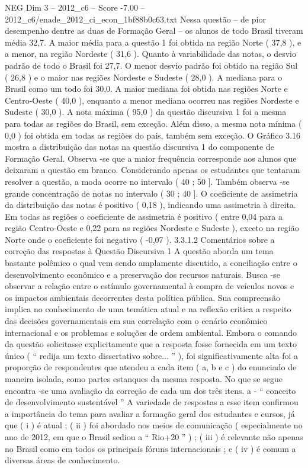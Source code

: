 \begin{textsample}{NEG Dim 3 – 2012\_c6 – Score -7.00 – 2012\_c6/enade\_2012\_ci\_econ\_1bf88b0c63.txt}
Nessa questão – de pior desempenho dentre as duas de Formação Geral – os alunos de todo Brasil tiveram média 32,7.
A maior média para a questão 1 foi obtida na região Norte ( 37,8 ), e a menor, na região Nordeste ( 31,6 ).
Quanto à variabilidade das notas, o desvio padrão de todo o Brasil foi 27,7.
O menor desvio padrão foi obtido na região Sul ( 26,8 ) e o maior nas regiões Nordeste e Sudeste ( 28,0 ).
A mediana para o Brasil como um todo foi 30,0.
A maior mediana foi obtida nas regiões Norte e Centro-Oeste ( 40,0 ), enquanto a menor mediana ocorreu nas regiões Nordeste e Sudeste ( 30,0 ).
A nota máxima ( 95,0 ) da questão discursiva 1 foi a mesma para todas as regiões do Brasil, sem exceção.
Além disso, a mesma nota mínima ( 0,0 ) foi obtida em todas as regiões do país, também sem exceção.
O Gráfico 3.16 mostra a distribuição das notas na questão discursiva 1 do componente de Formação Geral.
Observa -se que a maior frequência corresponde aos alunos que deixaram a questão em branco.
Considerando apenas os estudantes que tentaram resolver a questão, a moda ocorre no intervalo ( 40 ; 50 ].
Também observa -se grande concentração de notas no intervalo ( 30 ; 40 ].
O coeficiente de assimetria da distribuição das notas é positivo ( 0,18 ), indicando uma assimetria à direita.
Em todas as regiões o coeficiente de assimetria é positivo ( entre 0,04 para a região Centro-Oeste e 0,22 para as regiões Nordeste e Sudeste ), exceto na região Norte onde o coeficiente foi negativo ( -0,07 ). 3.3.1.2 Comentários sobre a correção das respostas à Questão Discursiva 1 A questão aborda um tema bastante polêmico o qual vem sendo amplamente discutido, a conciliação entre o desenvolvimento econômico e a preservação dos recursos naturais.
Busca -se observar a relação entre o estímulo governamental à compra de veículos novos e os impactos ambientais decorrentes desta política pública.
Sua compreensão implica no conhecimento de uma temática atual e na reflexão critica a respeito das decisões governamentais em sua correlação com o cenário econômico internacional e os problemas e soluções de ordem ambiental.
Embora o comando da questão solicitasse explicitamente que a resposta fosse fornecida em um texto único ( “ redija um texto dissertativo sobre... ” ), foi significativamente alta foi a proporção de respondentes que atendeu a cada item ( a, b e c ) do enunciado de maneira isolada, como partes estanques da mesma resposta.
No que se segue encontra -se uma avaliação da correção de cada um dos três itens. a - “ conceito de desenvolvimento sustentável ” A variedade de respostas a esse item confirmou a importância do tema para avaliar a formação geral dos estudantes e cursos, já que ( i ) é atual ; ( ii ) foi abordado nos meios de comunicação ( especialmente no ano de 2012, em que o Brasil sediou a “ Rio+20 ” ) ; ( iii ) é relevante não apenas no Brasil como em todos os principais fóruns internacionais ; e ( iv ) é comum a diversas áreas de conhecimento.

\end{textsample}
